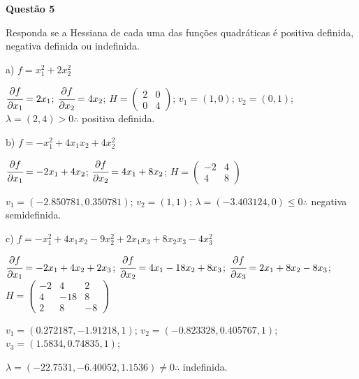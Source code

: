 \documentclass{rbfin}
\begin{document}
\singlespacing

\vspace{6mm}

\large

\textbf{Questão 5}

\normalsize

\vspace{6mm}

\doublespacing

Responda se a Hessiana de cada uma das funções quadráticas é positiva definida,
negativa definida ou indefinida.

a) $f = x_1^2 + 2x_2^2$

$\cfrac{\partial f}{\partial x_1} = 2 x_1$; $\cfrac{\partial f}{\partial x_2} = 4 x_2$; $H = \begin{pmatrix} 2 & 0 \\ 0 & 4 \end{pmatrix}$; $v_1 = (1, 0)$; $v_2 = (0, 1)$; $\lambda = (2, 4) > 0 \therefore$ positiva definida.

\dotfill

b) $f = -x_1^2 + 4x_1x_2 + 4x_2^2$

$\cfrac{\partial f}{\partial x_1} = -2 x_1 + 4 x_2$; $\cfrac{\partial f}{\partial x_2} = 4 x_1 + 8 x_2$; $H = \begin{pmatrix} -2 & 4 \\ 4 & 8 \end{pmatrix}$

$v_1 = (-2.850781, 0.350781)$; $v_2 = (1, 1)$; $\lambda = (-3.403124, 0) \le 0 \therefore$ negativa semidefinida.

\dotfill

c) $f = -x_1^2 + 4x_1x_2 - 9x_2^2 + 2x_1x_3 + 8x_2x_3 - 4x_3^2$

$\cfrac{\partial f}{\partial x_1} = -2 x_1 + 4 x_2 + 2 x_3$; $\cfrac{\partial f}{\partial x_2} = 4 x_1 - 18 x_2 + 8 x_3$; $\cfrac{\partial f}{\partial x_3} = 2 x_1 + 8 x_2 - 8 x_3$; $H = \begin{pmatrix} -2 & 4 & 2 \\ 4 & -18 & 8 \\ 2 & 8 & -8 \end{pmatrix}$

$v_1 = (0.272187, -1.91218, 1)$; $v_2 = (-0.823328, 0.405767, 1)$; $v_3 = (1.5834, 0.74835, 1)$; 

$\lambda = (-22.7531, -6.40052, 1.1536) \ne 0 \therefore$ indefinida.

\singlespacing

\vspace{6mm}
\end{document}
